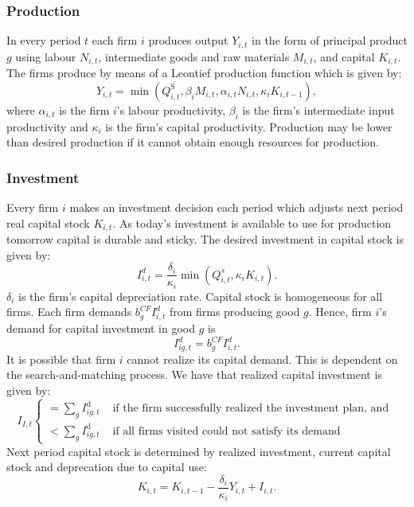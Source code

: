 \subsubsection{Production}
In every period $t$ each firm $i$ produces output $Y_{i,t}$ in the form of principal product $g$ using labour $N_{i,t}$, intermediate goods and raw materials $M_{i,t}$, and capital $K_{i,t}$. The firms produce by means of a Leontief production function which is given by:
\begin{equation}
Y_{i,t}=\min \left(Q_{i,t}^{\mathrm{S}}, \beta_i M_{i,t}, \alpha_{i,t} N_{i,t}, \kappa_i K_{i,t-1}\right),
\end{equation}
where $\alpha_{i,t}$ is the firm $i$'s labour productivity, $\beta_i$ is the firm's intermediate input productivity and $\kappa_i$ is the firm's capital productivity. Production may be lower than desired production if it cannot obtain enough resources for production.
\subsubsection{Investment}
Every firm $i$ makes an investment decision each period which adjusts next period real capital stock $K_{i,t}$. As today's investment is available to use for production tomorrow capital is durable and sticky. The desired investment in capital stock is given by:
\begin{equation}
    I^d_{i,t} = \frac{\delta_i}{\kappa_i} \min(Q^s_{i,t},\kappa_iK_{i,t}).
\end{equation}
$\delta_i$ is the firm's capital depreciation rate. Capital stock is homogeneous for all firms. Each firm demands $b_g^{CF}I^d_{i,t}$ from firms producing good $g$. Hence, firm $i$'s demand for capital investment in good $g$ is 
\begin{equation}
I^d_{ig,t} = b_g^{CF}I^d_{i,t}.    
\end{equation}
It is possible that firm $i$ cannot realize its capital demand. This is dependent on the search-and-matching process. We have that realized capital investment is given by:
\begin{equation}
I_{I,t} \begin{cases}=\sum_g I_{i g,t}^{\mathrm{d}}  & \text { if the firm successfully realized the investment plan, and } \\ <\sum_g I_{i g,t}^{\mathrm{d}}  & \text { if all firms visited could not satisfy its demand }\end{cases}
\end{equation}
Next period capital stock is determined by realized investment, current capital stock and deprecation due to capital use:
\begin{equation}
    K_{i,t} = K_{i,t-1}-\frac{\delta_i}{\kappa_i}Y_{i,t} +I_{i,t}.
\end{equation}
